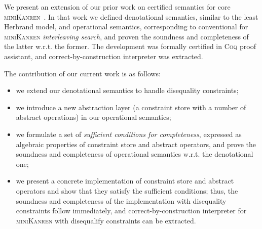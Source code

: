 \documentclass[submission,copyright,creativecommons]{eptcs}
\newcommand{\reprfun}{\mathfrak{f}}
\begin{document}

We present an extension of our prior work on certified semantics for core \textsc{miniKanren}~\cite{CertifiedSemantics}. In that work we
defined denotational semantics, similar to the least Herbrand model, and operational semantics, corresponding to conventional for \textsc{miniKanren}
\emph{interleaving search}, and proven the soundness and completeness of the latter w.r.t. the former. The development was formally certified in
\textsc{Coq} proof assistant, and correct-by-construction interpreter was extracted.

The contribution of our current work is as follows:

\begin{itemize}
\item we extend our denotational semantics to handle disequality constraints;
\item we introduce a new abstraction layer (a constraint store with a number of abstract operations) in our operational semantics;
\item we formulate a set of \emph{sufficient conditions for completeness}, expressed as algebraic properties of constraint store and
  abstract operators, and prove the soundness and completeness of operational semantics w.r.t. the denotational one;
\item we present a concrete implementation of constraint store and abstract operators and show that they satisfy the
  sufficient conditions; thus, the soundness and completeness of the implementation with disequality constraints follow
  immediately, and correct-by-construction interpreter for \textsc{miniKanren} with disequalify constraints
  can be extracted.
\end{itemize}

\end{document}
